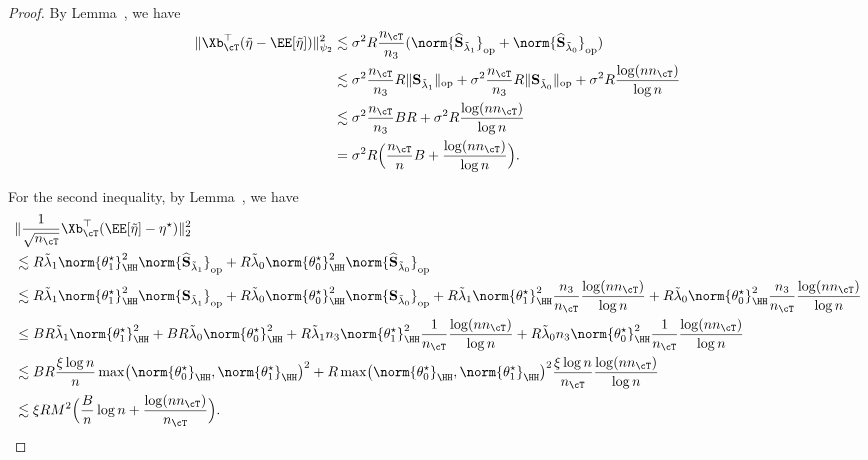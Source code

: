 \documentclass[12pt,a4paper,pdftex,onepage]{article}
\newcommand{\op}{\operatorname{op}}
\newcommand{\sig}{\sigma}
\newcommand{\Sbar}{\mathbf{S}}
\newcommand{\Shat}{\widehat{\mathbf{S}}}
\begin{document}
\begin{proof}
By Lemma~, we have
\begin{align*}
\|\Xb_\cT^\top (\tilde{\eta}-\EE[\tilde{\eta}]) \|^2_{\psi_2} & \lesssim \sig^2  R\frac{n_{\cT}}{n_3}(\norm{\Shat_{\tilde{\lambda}_1}}_{\op} + \norm{\Shat_{\tilde{\lambda}_0}}_{\op}) \\
&\lesssim    \sig^2  \frac{n_{\cT}}{n_3} R \|\Sbar_{\tilde{\lambda}_1}  \|_{\op}+\sig^2  \frac{n_{\cT}}{n_3} R \|\Sbar_{\tilde{\lambda}_0}  \|_{\op} + \sig^2 R  \frac{\log (nn_\cT)}{\log n} \\
&\lesssim \sig^2 \frac{n_{\cT}}{n_3} BR +\sig^2R \frac{\log (nn_\cT)}{\log n} \\
&= \sig^2 R  \Bigl(\frac{n_\cT}{n}B + \frac{\log (nn_\cT)}{\log n}\Bigr).
\end{align*}

For the second inequality, by Lemma~, we have
\begin{align*}
&\|\frac{1}{\sqrt{n_{\cT}}}\Xb_\cT^\top (\EE[\tilde{\eta}] -\eta^\star) \|^2_{2} \\
&\lesssim  R  \tilde{\lambda}_1 \norm{\theta_1^\star}_{\HH}^2 \norm{\Shat_{\tilde{\lambda}_1}}_{\op} +  R  \tilde{\lambda}_0 \norm{\theta_0^\star}_{\HH}^2 \norm{\Shat_{\tilde{\lambda}_0}}_{\op}\\
&\lesssim  R \tilde{\lambda}_1 \norm{\theta_1^\star}_{\HH}^2 \norm{\Sbar_{\tilde{\lambda}_1}}_{\op} 
+  R  \tilde{\lambda}_0 \norm{\theta_0^\star}_{\HH}^2 \norm{\Sbar_{\tilde{\lambda}_0}}_{\op} 
+   R \tilde{\lambda}_1 \norm{\theta_1^\star}_{\HH}^2\frac{n_3}{n_{\cT}} \frac{\log (nn_\cT)}{\log n}+  R \tilde{\lambda}_0 \norm{\theta_0^\star}_{\HH}^2 \frac{n_3}{n_{\cT}}\frac{\log (nn_\cT)}{\log n}\\
&\leq BR  \tilde{\lambda}_1 \norm{\theta_1^\star}_{\HH}^2  + BR \tilde{\lambda}_0 \norm{\theta_0^\star}_{\HH}^2  +  R \tilde{\lambda}_1n_3 \norm{\theta_1^\star}_{\HH}^2\frac{1}{n_{\cT}}\frac{\log (nn_\cT)}{\log n}+  R \tilde{\lambda}_0 n_3 \norm{\theta_0^\star}_{\HH}^2 \frac{1}{n_{\cT}}\frac{\log (nn_\cT)}{\log n} \\
&\lesssim BR \frac{\xi\log n }{n} \max\bigl(\norm{\theta_0^\star}_{\HH},\norm{\theta_1^\star}_{\HH}\bigr)^2 +R \max\bigl(\norm{\theta_0^\star}_{\HH},\norm{\theta_1^\star}_{\HH}\bigr)^2\frac{\xi \log n}{n_{\cT}}\frac{\log (nn_\cT)}{\log n} \\
&\lesssim \xi RM^2  \Bigl(\frac{B}{n}\log n +\frac{\log (nn_\cT)}{n_{\cT}}\Bigr).
\end{align*}    
\end{proof}
\end{document}
